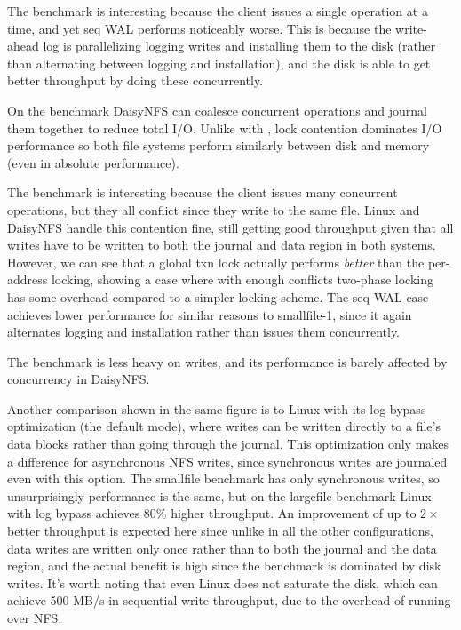 The  benchmark is interesting because the client issues a single
operation at a time, and yet seq WAL performs noticeably worse. This is because
the write-ahead log is parallelizing logging writes and installing them to the
disk (rather than alternating between logging and installation), and the disk is
able to get better throughput by doing these concurrently.

On the  benchmark DaisyNFS can coalesce concurrent operations
and journal them together to reduce total I/O. Unlike with ,
lock contention dominates I/O performance so both file systems perform similarly
between disk and memory (even in absolute performance).

The  benchmark is interesting because the client issues many
concurrent operations, but they all conflict since they write to the same file.
Linux and DaisyNFS handle this contention fine, still getting good throughput
given that all writes have to be written to both the journal and data region in
both systems. However, we can see that a global txn lock actually performs
\emph{better} than the per-address locking, showing a case where with enough
conflicts two-phase locking has some overhead compared to a simpler locking
scheme. The seq WAL case achieves lower performance for similar reasons to
smallfile-1, since it again alternates logging and installation rather than
issues them concurrently.

The  benchmark is less heavy on writes, and its performance
is barely affected by concurrency in DaisyNFS.

Another comparison shown in the same figure is to Linux with its log bypass
optimization (the default  mode), where writes can be written
directly to a file's data blocks rather than going through the journal. This optimization
only makes a difference for asynchronous NFS writes, since synchronous writes
are journaled even with this option. The smallfile benchmark has only
synchronous writes, so unsurprisingly performance is the same, but on the
largefile benchmark Linux with log bypass achieves 80\% higher throughput. An
improvement of up to $2\times$ better throughput is expected here since unlike
in all the other configurations, data writes are written only once rather than
to both the journal and the data region, and the actual benefit is high since
the benchmark is dominated by disk writes. It's worth noting that even Linux
does not saturate the disk, which can achieve 500 MB/s in sequential write
throughput, due to the overhead of running over NFS.

